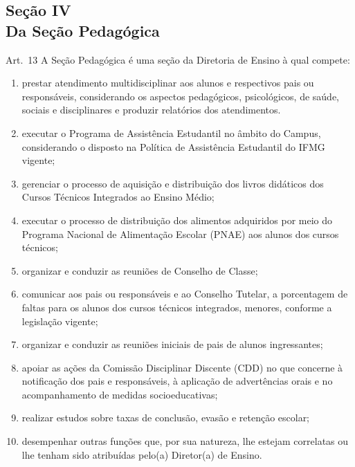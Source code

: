 \documentclass[a4paper,12pt]{report}
\begin{document}
\subsection{Seção IV \\ Da Seção Pedagógica}

Art.~13 A Seção Pedagógica é uma seção da Diretoria de Ensino à qual compete:

\begin{enumerate}
\renewcommand{\labelenumi}{\Roman{enumi}}

\item prestar atendimento multidisciplinar aos alunos e respectivos pais ou responsáveis,  
      considerando os aspectos pedagógicos, psicológicos, de saúde, sociais e disciplinares 
      e produzir relatórios dos atendimentos.  
     
\item executar o Programa de Assistência Estudantil no âmbito do Campus, considerando o 
      disposto na Política de Assistência Estudantil do IFMG vigente;
      
\item gerenciar o processo de aquisição e distribuição dos livros didáticos dos Cursos 
      Técnicos Integrados ao Ensino Médio;

\item executar o processo de distribuição dos alimentos adquiridos por meio do Programa 
      Nacional de Alimentação Escolar (PNAE) aos alunos dos cursos técnicos;
      
\item organizar e conduzir as reuniões de Conselho de Classe;

\item comunicar aos pais ou responsáveis e ao Conselho Tutelar, a porcentagem de faltas 
      para os alunos dos cursos técnicos integrados, menores, conforme a legislação 
      vigente;

\item organizar e conduzir as reuniões iniciais de pais de alunos ingressantes;
    
\item apoiar as ações da Comissão Disciplinar Discente (CDD) no que concerne à notificação 
      dos pais e responsáveis, à aplicação de advertências orais e no acompanhamento de 
      medidas socioeducativas;
      
\item realizar estudos sobre taxas de conclusão, evasão e retenção escolar;
 
\item desempenhar outras funções que, por sua natureza, lhe estejam correlatas ou lhe 
      tenham sido atribuídas pelo(a) Diretor(a) de Ensino.
\end{enumerate}
\end{document}
